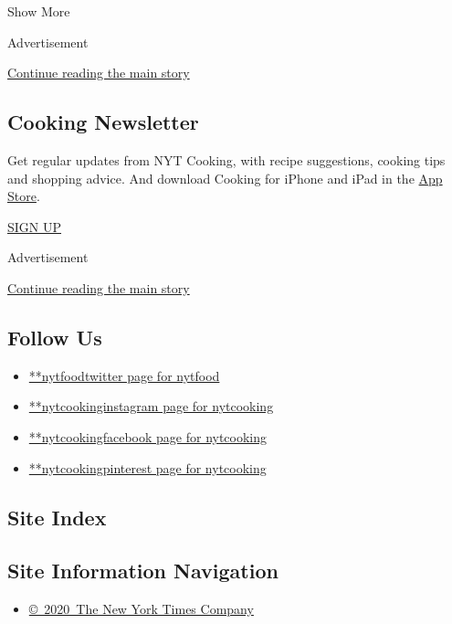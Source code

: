 Show More

Advertisement

\protect\hyperlink{after-mid2}{Continue reading the main story}

\hypertarget{cooking-newsletter}{%
\subsection{Cooking Newsletter}\label{cooking-newsletter}}

Get regular updates from NYT Cooking, with recipe suggestions, cooking
tips and shopping advice. And download Cooking for iPhone and iPad in
the
\href{https://itunes.apple.com/us/app/nyt-cooking-recipes-from-new/id911422904?mt=8}{App
Store}.

\href{/newsletters/signup/CK}{SIGN UP}

Advertisement

\protect\hyperlink{after-mktg}{Continue reading the main story}

\hypertarget{follow-us}{%
\subsection{Follow Us}\label{follow-us}}

\begin{itemize}
\tightlist
\item
  \href{https://twitter.com/nytfood}{**nytfoodtwitter page for nytfood}
\item
  \href{https://instagram.com/nytcooking}{**nytcookinginstagram page for
  nytcooking}
\item
  \href{https://www.facebookcorewwwi.onion/nytcooking}{**nytcookingfacebook
  page for nytcooking}
\item
  \href{https://pinterest.com/nytcooking}{**nytcookingpinterest page for
  nytcooking}
\end{itemize}

\hypertarget{site-index}{%
\subsection{Site Index}\label{site-index}}

\hypertarget{site-information-navigation}{%
\subsection{Site Information
Navigation}\label{site-information-navigation}}

\begin{itemize}
\tightlist
\item
  \href{https://help.nytimes3xbfgragh.onion/hc/en-us/articles/115014792127-Copyright-notice}{©~2020~The
  New York Times Company}
\end{itemize}


